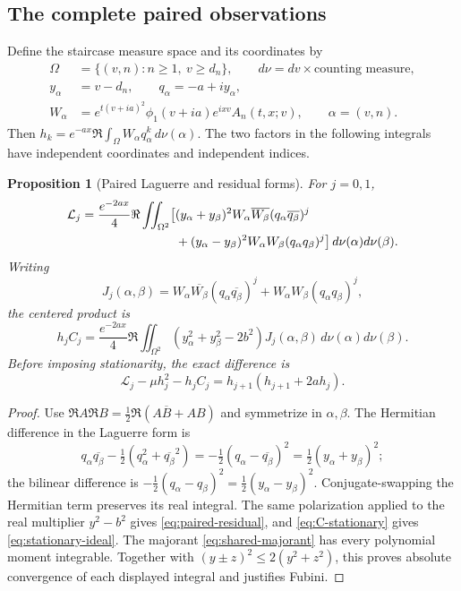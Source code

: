 \documentclass[11pt]{article}
\numberwithin{equation}{section}
\newtheorem{proposition}[theorem]{Proposition}
\theoremstyle{definition}
\theoremstyle{remark}
\newcommand{\Lag}{\mathcal L}
\begin{document}
\subsection{The complete paired observations}
Define the staircase measure space and its coordinates by
\begin{equation}
 \begin{split}
 \Omega&=\{(v,n):n\ge1,\ v\ge d_n\},\qquad
 d\nu=dv\times\text{counting measure},\\
 y_\alpha&=v-d_n,\qquad q_\alpha=-a+iy_\alpha,\\
 W_\alpha&=e^{t(v+ia)^2}\phi_1(v+ia)e^{ixv}A_n(t,x;v),
 \qquad \alpha=(v,n).
 \end{split}
 \label{eq:pair-domain}
\end{equation}
Then $h_k=e^{-ax}\Re\int_\Omega W_\alpha q_\alpha^k\,d\nu(\alpha)$.
The two factors in the following integrals have independent coordinates
and independent indices.
\begin{proposition}[Paired Laguerre and residual forms]
For $j=0,1$,
\begin{align}
 \Lag_j=\frac{e^{-2ax}}4\Re\iint_{\Omega^2}\bigl[&
 (y_\alpha+y_\beta)^2 W_\alpha\overline{W_\beta}
       (q_\alpha\overline{q_\beta})^j\notag\\
 &+(y_\alpha-y_\beta)^2 W_\alpha W_\beta
       (q_\alpha q_\beta)^j\bigr]\,d\nu(\alpha)d\nu(\beta).
 \label{eq:paired-laguerre}
\end{align}
Writing
\begin{equation}
 J_j(\alpha,\beta)=W_\alpha\overline{W_\beta}
       (q_\alpha\overline{q_\beta})^j
       +W_\alpha W_\beta(q_\alpha q_\beta)^j,
 \label{eq:paired-J}
\end{equation}
the centered product is
\begin{equation}
 h_jC_j=\frac{e^{-2ax}}4\Re\iint_{\Omega^2}
 (y_\alpha^2+y_\beta^2-2b^2)J_j(\alpha,\beta)\,
 d\nu(\alpha)d\nu(\beta).
 \label{eq:paired-residual}
\end{equation}
Before imposing stationarity, the exact difference is
\begin{equation}
 \Lag_j-\mu h_j^2-h_jC_j
       =h_{j+1}(h_{j+1}+2ah_j).
 \label{eq:stationary-ideal}
\end{equation}
\end{proposition}
\begin{proof}
Use $\Re A\Re B=\tfrac12\Re(A\overline B+AB)$ and symmetrize
in $\alpha,\beta$. The Hermitian difference in the Laguerre form is
\[
 q_\alpha\overline{q_\beta}
 -\tfrac12(q_\alpha^2+\overline{q_\beta}^{2})
 =-\tfrac12(q_\alpha-\overline{q_\beta})^2
 =\tfrac12(y_\alpha+y_\beta)^2;
\]
the bilinear difference is
$-\tfrac12(q_\alpha-q_\beta)^2
=\tfrac12(y_\alpha-y_\beta)^2$.
Conjugate-swapping the Hermitian term preserves its real integral.
The same polarization applied to the real multiplier $y^2-b^2$
gives \eqref{eq:paired-residual}, and \eqref{eq:C-stationary} gives
\eqref{eq:stationary-ideal}. The majorant
\eqref{eq:shared-majorant} has every polynomial moment integrable.
Together with $(y\pm z)^2\le2(y^2+z^2)$, this proves absolute
convergence of each displayed integral and justifies Fubini.
\end{proof}
\end{document}
